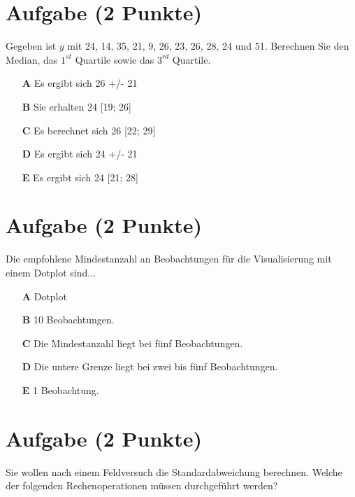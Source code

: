 \documentclass[a4paper, 9pt]{scrartcl}\usepackage[]{graphicx}\usepackage[]{xcolor}
\begin{document}
\section{Aufgabe \hfill (2 Punkte)}




Gegeben ist $y$ mit 24, 14, 35, 21, 9, 26, 23, 26, 28, 24 und 51. Berechnen Sie den Median, das $1^{st}$ Quartile sowie das $3^{rd}$ Quartile.




\begin{enumerate}
\item [\textbf{A} \msquare] Es ergibt sich 26 +/- 21
\item [\textbf{B} \msquare] Sie erhalten 24 [19; 26]
\item [\textbf{C} \msquare] Es berechnet sich 26 [22; 29]
\item [\textbf{D} \msquare] Es ergibt sich 24 +/- 21
\item [\textbf{E} \msquare] Es ergibt sich 24 [21; 28]
\end{enumerate} 

\section{Aufgabe \hfill (2 Punkte)}



Die empfohlene Mindestanzahl an Beobachtungen für die Visualisierung mit einem Dotplot sind...



\begin{enumerate}
\item [\textbf{A} \msquare] Dotplot
\item [\textbf{B} \msquare] 10 Beobachtungen.
\item [\textbf{C} \msquare] Die Mindestanzahl liegt bei fünf Beobachtungen.
\item [\textbf{D} \msquare] Die untere Grenze liegt bei zwei bis fünf Beobachtungen.
\item [\textbf{E} \msquare] 1 Beobachtung.
\end{enumerate}

\section{Aufgabe \hfill (2 Punkte)}



Sie wollen nach einem Feldversuch die Standardabweichung berechnen. Welche der folgenden Rechenoperationen müssen durchgeführt werden?
\end{document}

